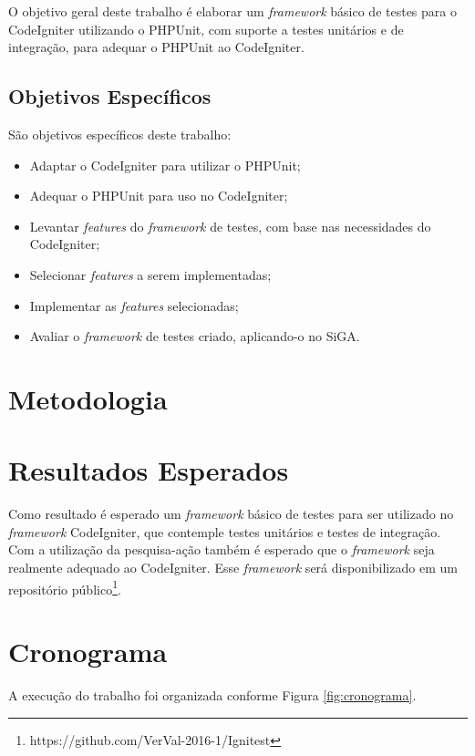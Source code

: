 O objetivo geral deste trabalho é elaborar um \textit{framework} básico de testes para o CodeIgniter utilizando o PHPUnit, com suporte a 
testes unitários e de integração, para adequar o PHPUnit ao CodeIgniter.

\subsection{Objetivos Específicos}

São objetivos específicos deste trabalho:

\begin{itemize}
 \item Adaptar o CodeIgniter para utilizar o PHPUnit;
 \item Adequar o PHPUnit para uso no CodeIgniter;
 \item Levantar \textit{features} do \textit{framework} de testes, com base nas necessidades do CodeIgniter;
 \item Selecionar \textit{features} a serem implementadas;
 \item Implementar as \textit{features} selecionadas;
 \item Avaliar o \textit{framework} de testes criado, aplicando-o no SiGA.
\end{itemize}


\section{Metodologia}

  

\section{Resultados Esperados}

Como resultado é esperado um \textit{framework} básico de testes para ser utilizado no \textit{framework} CodeIgniter, que contemple
testes unitários e testes de integração. Com a utilização da pesquisa-ação também é esperado que o \textit{framework} seja realmente adequado
ao CodeIgniter. Esse \textit{framework} será disponibilizado em um repositório público\footnote{https://github.com/VerVal-2016-1/Ignitest}.

\section{Cronograma}

A execução do trabalho foi organizada conforme Figura \ref{fig:cronograma}.

